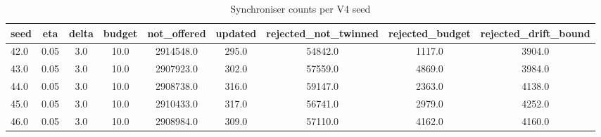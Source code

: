\begin{table}[htbp]
\centering
\caption{Synchroniser counts per V4 seed}
\label{tab:twin_sync}
\begin{tabular}{lcccccccc}
\toprule
seed & eta & delta & budget & not\_offered & updated & rejected\_not\_twinned & rejected\_budget & rejected\_drift\_bound \\
\midrule
42.0 & 0.05 & 3.0 & 10.0 & 2914548.0 & 295.0 & 54842.0 & 1117.0 & 3904.0 \\
43.0 & 0.05 & 3.0 & 10.0 & 2907923.0 & 302.0 & 57559.0 & 4869.0 & 3984.0 \\
44.0 & 0.05 & 3.0 & 10.0 & 2908738.0 & 316.0 & 59147.0 & 2363.0 & 4138.0 \\
45.0 & 0.05 & 3.0 & 10.0 & 2910433.0 & 317.0 & 56741.0 & 2979.0 & 4252.0 \\
46.0 & 0.05 & 3.0 & 10.0 & 2908984.0 & 309.0 & 57110.0 & 4162.0 & 4160.0 \\
\bottomrule
\end{tabular}
\end{table}